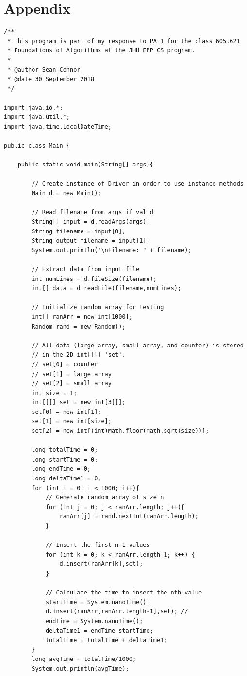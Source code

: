 \documentclass[11pt]{article}
\begin{document}
\section{Appendix}
\begin{lstlisting}
/**
 * This program is part of my response to PA 1 for the class 605.621
 * Foundations of Algorithms at the JHU EPP CS program.
 *
 * @author Sean Connor
 * @date 30 September 2018
 */

import java.io.*;
import java.util.*;
import java.time.LocalDateTime;

public class Main {

    public static void main(String[] args){

        // Create instance of Driver in order to use instance methods
        Main d = new Main();

        // Read filename from args if valid
        String[] input = d.readArgs(args);
        String filename = input[0];
        String output_filename = input[1];
        System.out.println("\nFilename: " + filename);

        // Extract data from input file
        int numLines = d.fileSize(filename);
        int[] data = d.readFile(filename,numLines);

        // Initialize random array for testing
        int[] ranArr = new int[1000];
        Random rand = new Random();

        // All data (large array, small array, and counter) is stored
        // in the 2D int[][] 'set'.
        // set[0] = counter
        // set[1] = large array
        // set[2] = small array
        int size = 1;
        int[][] set = new int[3][];
        set[0] = new int[1];
        set[1] = new int[size];
        set[2] = new int[(int)Math.floor(Math.sqrt(size))];

        long totalTime = 0;
        long startTime = 0;
        long endTime = 0;
        long deltaTime1 = 0;
        for (int i = 0; i < 1000; i++){
            // Generate random array of size n
            for (int j = 0; j < ranArr.length; j++){
                ranArr[j] = rand.nextInt(ranArr.length);
            }

            // Insert the first n-1 values
            for (int k = 0; k < ranArr.length-1; k++) {
                d.insert(ranArr[k],set);
            }

            // Calculate the time to insert the nth value
            startTime = System.nanoTime();
            d.insert(ranArr[ranArr.length-1],set); //
            endTime = System.nanoTime();
            deltaTime1 = endTime-startTime;
            totalTime = totalTime + deltaTime1;
        }
        long avgTime = totalTime/1000;
        System.out.println(avgTime);


\end{lstlisting}
\end{document}
